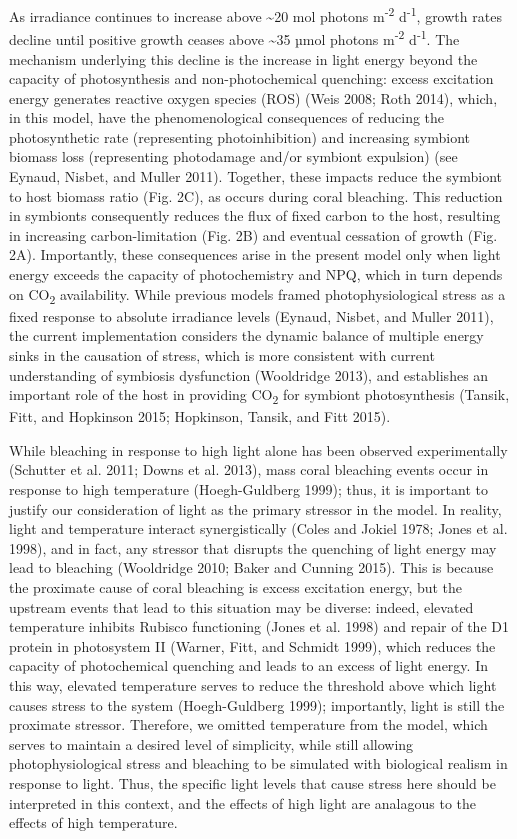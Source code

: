 \documentclass[]{elsarticle} %
\begin{document}
As irradiance continues to increase above \textasciitilde{}20 mol
photons m\textsuperscript{-2} d\textsuperscript{-1}, growth rates
decline until positive growth ceases above \textasciitilde{}35 µmol
photons m\textsuperscript{-2} d\textsuperscript{-1}. The mechanism
underlying this decline is the increase in light energy beyond the
capacity of photosynthesis and non-photochemical quenching: excess
excitation energy generates reactive oxygen species (ROS) (Weis 2008;
Roth 2014), which, in this model, have the phenomenological consequences
of reducing the photosynthetic rate (representing photoinhibition) and
increasing symbiont biomass loss (representing photodamage and/or
symbiont expulsion) (see Eynaud, Nisbet, and Muller 2011). Together,
these impacts reduce the symbiont to host biomass ratio (Fig. 2C), as
occurs during coral bleaching. This reduction in symbionts consequently
reduces the flux of fixed carbon to the host, resulting in increasing
carbon-limitation (Fig. 2B) and eventual cessation of growth (Fig. 2A).
Importantly, these consequences arise in the present model only when
light energy exceeds the capacity of photochemistry and NPQ, which in
turn depends on CO\textsubscript{2} availability. While previous models
framed photophysiological stress as a fixed response to absolute
irradiance levels (Eynaud, Nisbet, and Muller 2011), the current
implementation considers the dynamic balance of multiple energy sinks in
the causation of stress, which is more consistent with current
understanding of symbiosis dysfunction (Wooldridge 2013), and
establishes an important role of the host in providing
CO\textsubscript{2} for symbiont photosynthesis (Tansik, Fitt, and
Hopkinson 2015; Hopkinson, Tansik, and Fitt 2015).

While bleaching in response to high light alone has been observed
experimentally (Schutter et al. 2011; Downs et al. 2013), mass coral
bleaching events occur in response to high temperature (Hoegh-Guldberg
1999); thus, it is important to justify our consideration of light as
the primary stressor in the model. In reality, light and temperature
interact synergistically (Coles and Jokiel 1978; Jones et al. 1998), and
in fact, any stressor that disrupts the quenching of light energy may
lead to bleaching (Wooldridge 2010; Baker and Cunning 2015). This is
because the proximate cause of coral bleaching is excess excitation
energy, but the upstream events that lead to this situation may be
diverse: indeed, elevated temperature inhibits Rubisco functioning
(Jones et al. 1998) and repair of the D1 protein in photosystem II
(Warner, Fitt, and Schmidt 1999), which reduces the capacity of
photochemical quenching and leads to an excess of light energy. In this
way, elevated temperature serves to reduce the threshold above which
light causes stress to the system (Hoegh-Guldberg 1999); importantly,
light is still the proximate stressor. Therefore, we omitted temperature
from the model, which serves to maintain a desired level of simplicity,
while still allowing photophysiological stress and bleaching to be
simulated with biological realism in response to light. Thus, the
specific light levels that cause stress here should be interpreted in
this context, and the effects of high light are analagous to the effects
of high temperature.
\end{document}
